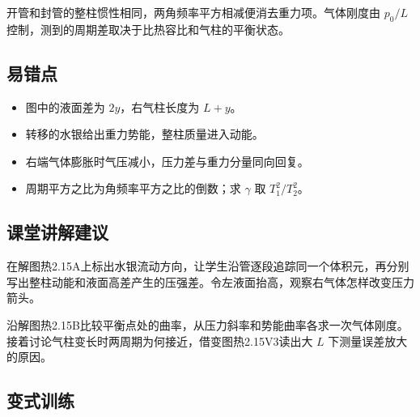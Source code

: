 \documentclass[UTF8,fontset=fandol,a4paper,11pt]{ctexart}
\begin{document}
开管和封管的整柱惯性相同，两角频率平方相减便消去重力项。气体刚度由 $p_0/L$ 控制，测到的周期差取决于比热容比和气柱的平衡状态。



\subsection*{易错点}

\begin{itemize}
\item 图中的液面差为 $2y$，右气柱长度为 $L+y$。
\item 转移的水银给出重力势能，整柱质量进入动能。
\item 右端气体膨胀时气压减小，压力差与重力分量同向回复。
\item 周期平方之比为角频率平方之比的倒数；求 $\gamma$ 取 $T_1^2/T_2^2$。
\end{itemize}



\subsection*{课堂讲解建议}

在解图热2.15A上标出水银流动方向，让学生沿管逐段追踪同一个体积元，再分别写出整柱动能和液面高差产生的压强差。令左液面抬高，观察右气体怎样改变压力箭头。
 
沿解图热2.15B比较平衡点处的曲率，从压力斜率和势能曲率各求一次气体刚度。接着讨论气柱变长时两周期为何接近，借变图热2.15V3读出大 $L$ 下测量误差放大的原因。



\subsection*{变式训练}
\end{document}
